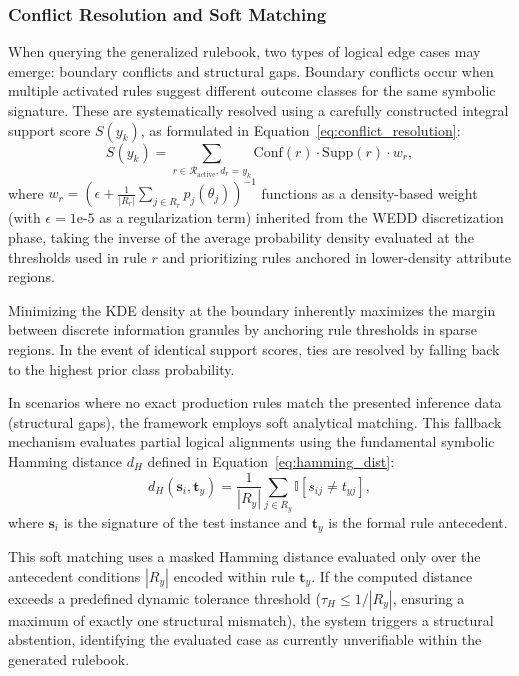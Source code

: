 \documentclass[make,article,submit,pdftex,moreauthors]{Definitions/mdpi}
\newcommand{\Rule}{\mathcal{R}}
\begin{document}
\subsubsection{Conflict Resolution and Soft Matching}

When querying the generalized rulebook, two types of logical edge cases may emerge: boundary conflicts and structural gaps. Boundary conflicts occur when multiple activated rules suggest different outcome classes for the same symbolic signature. These are systematically resolved using a carefully constructed integral support score $S(y_k)$, as formulated in Equation~\eqref{eq:conflict_resolution}:
\begin{equation}
 \label{eq:conflict_resolution}
 S(y_k) = \sum_{r \in \Rule_{\text{active}}, d_r=y_k} \mathrm{Conf}(r) \cdot \mathrm{Supp}(r) \cdot w_r,
\end{equation}
where $w_r = \left( \epsilon + \frac{1}{|R_r|} \sum_{j \in R_r} p_j(\theta_{j}) \right)^{-1}$ functions as a density-based weight (with $\epsilon = 1\text{e-}5$ as a regularization term) inherited from the WEDD discretization phase, taking the inverse of the average probability density evaluated at the thresholds used in rule $r$ and prioritizing rules anchored in lower-density attribute regions. 

Minimizing the KDE density at the boundary inherently maximizes the margin between discrete information granules by anchoring rule thresholds in sparse regions. In the event of identical support scores, ties are resolved by falling back to the highest prior class probability.

In scenarios where no exact production rules match the presented inference data (structural gaps), the framework employs soft analytical matching. This fallback mechanism evaluates partial logical alignments using the fundamental symbolic Hamming distance $d_H$ defined in Equation~\eqref{eq:hamming_dist}:
\begin{equation}
 \label{eq:hamming_dist}
 d_H(\mathbf{s}_i,\mathbf{t}_y) = \frac{1}{|R_y|}\sum_{j \in R_y}\mathbb{I}[s_{ij} \neq t_{yj}],
\end{equation}
where $\mathbf{s}_i$ is the signature of the test instance and $\mathbf{t}_y$ is the formal rule antecedent.

This soft matching uses a masked Hamming distance evaluated only over the antecedent conditions $|R_y|$ encoded within rule $\mathbf{t}_y$. If the computed distance exceeds a predefined dynamic tolerance threshold ($\tau_H \leq 1/|R_y|$, ensuring a maximum of exactly one structural mismatch), the system triggers a structural abstention, identifying the evaluated case as currently unverifiable within the generated rulebook.
\end{document}
